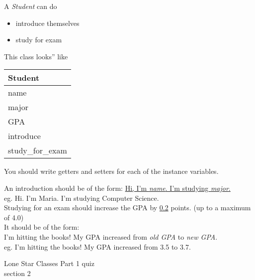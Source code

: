 \documentclass{article}
\newcommand{\tab}{\hspace*{0.25in}}
\newcommand{\csq}[1]{\reflectbox{''}#1''}  %
\begin{document}
\begin{enumerate}
\begin{minipage}{.6\textwidth}
		A \textit{Student} can do
		\begin{itemize}
			\item introduce themselves
			\item study for exam
		\end{itemize}
	\end{minipage} 
	\begin{minipage}{.4\textwidth}
		This class \csq{looks} like
		 
		\vspace*{1em}
		\begin{tabular}{|l|}
			\hline Student\\ \hline
			name\\ major\\ GPA\\ \hline
			introduce\\ study\_for\_exam \\  \hline
		\end{tabular}
	\end{minipage}

	\vspace*{2ex}
	You should write getters and setters for each of the instance variables.\

	An introduction should be of the form: \underline{Hi, I'm  \textit{name}.  
	I'm studying \textit{major}.}\\
	\tab \tab eg. Hi. I'm Maria. I'm studying Computer Science.\\

	Studying for an exam should increase the GPA by \underline{0.2} points. (up to a maximum of 4.0)\\  
	It should be of the form: \\
	I'm hitting the books! My GPA increased from \textit{old GPA} to \textit{new GPA}.\\
	\tab \tab eg. I'm hitting the books! My GPA increased from 3.5 to 3.7.\\


\end{enumerate}
\pagebreak
Lone Star \hfill Classes Part 1 quiz\\
section 2\\
\end{document}
